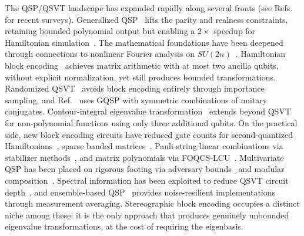 
The QSP/QSVT landscape has expanded rapidly along several
fronts (see Refs.~\cite{Lin2025,JovenEtAl2025} for recent
surveys).  Generalized QSP~\cite{MotlaghWiebe2023}
lifts the parity and realness constraints, retaining bounded
polynomial output but enabling a $2\times$ speedup for
Hamiltonian simulation~\cite{BerryMotlaghPantaleoniWiebe2024}.
The mathematical foundations have been
deepened through connections to nonlinear Fourier analysis on
$SU(2n)$~\cite{AlexisBeckerEtAl2026,Laneve2025b}.
Hamiltonian block encoding~\cite{KangSu2025} achieves matrix
arithmetic with at most two ancilla qubits, without explicit
normalization, yet still produces bounded transformations.
Randomized QSVT~\cite{WangZhangHazraEtAl2025} avoids block
encoding entirely through importance sampling, and
Ref.~\cite{MahasingheEtAl2025} uses GQSP with symmetric
combinations of unitary conjugates.  Contour-integral
eigenvalue transformation~\cite{JiangAn2026} extends
beyond QSVT for non-polynomial functions using only three
additional qubits.  On the practical side, new block encoding
circuits have reduced gate counts for second-quantized
Hamiltonians~\cite{LiuZhuLowLinYang2025}, sparse
banded matrices~\cite{ZecchiEtAl2026}, Pauli-string linear
combinations via stabilizer
methods~\cite{SchilloSturmQuay2026}, and matrix
polynomials via FOQCS-LCU~\cite{NibbiEtAl2026}.
Multivariate QSP has been placed on rigorous footing via
adversary bounds~\cite{Laneve2025} and modular
composition~\cite{RossiCeroniChuang2025}.
Spectral information has been exploited to reduce
QSVT circuit depth~\cite{Suresh2026}, and ensemble-based
QSP~\cite{LiuDongAnNiu2026} provides noise-resilient
implementations through measurement averaging.
Stereographic block encoding occupies a distinct niche among
these: it is the only approach that produces genuinely unbounded
eigenvalue transformations, at the cost of requiring the
eigenbasis.


